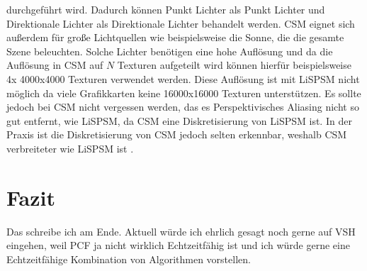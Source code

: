 durchgeführt wird. 
Dadurch können Punkt Lichter als Punkt Lichter und Direktionale Lichter als Direktionale Lichter behandelt werden.
CSM eignet sich außerdem für große Lichtquellen wie beispielsweise die Sonne, die die gesamte Szene beleuchten.
Solche Lichter benötigen eine hohe Auflösung und da die Auflösung in CSM auf $N$ Texturen aufgeteilt wird können hierfür beispielsweise 
4x 4000x4000 Texturen verwendet werden. Diese Auflösung ist mit LiSPSM nicht möglich da viele Grafikkarten keine
16000x16000 Texturen unterstützen.
Es sollte jedoch bei CSM nicht vergessen werden, das es Perspektivisches Aliasing nicht so gut entfernt, wie 
LiSPSM, da CSM eine Diskretisierung von LiSPSM ist.
In der Praxis ist die Diskretisierung von CSM jedoch selten erkennbar, weshalb CSM verbreiteter wie LiSPSM ist \cite{Survey2011}.

\chapter{Fazit}
Das schreibe ich am Ende. Aktuell würde ich ehrlich gesagt noch gerne auf VSH eingehen,
weil PCF ja nicht wirklich Echtzeitfähig ist und
ich würde gerne eine Echtzeitfähige Kombination von Algorithmen vorstellen.

















